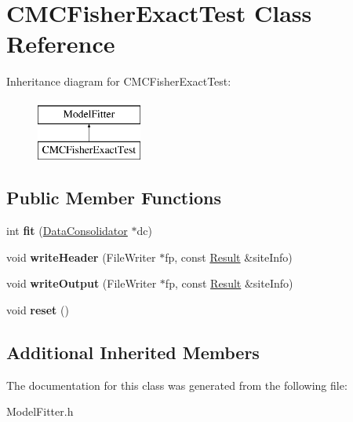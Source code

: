 \hypertarget{classCMCFisherExactTest}{\section{C\-M\-C\-Fisher\-Exact\-Test Class Reference}
\label{classCMCFisherExactTest}
}
Inheritance diagram for C\-M\-C\-Fisher\-Exact\-Test\-:\begin{figure}[H]
\begin{center}
\leavevmode
\includegraphics[height=2.000000cm]{classCMCFisherExactTest}
\end{center}
\end{figure}
\subsection*{Public Member Functions}
\begin{DoxyCompactItemize}
\item 
\hypertarget{classCMCFisherExactTest_aff85bb19c2937f8c17c0db4707919dc0}{int {\bfseries fit} (\hyperlink{classDataConsolidator}{Data\-Consolidator} $\ast$dc)}\label{classCMCFisherExactTest_aff85bb19c2937f8c17c0db4707919dc0}

\item 
\hypertarget{classCMCFisherExactTest_afc44c2bd2677c4e8de567b7b1416f396}{void {\bfseries write\-Header} (File\-Writer $\ast$fp, const \hyperlink{classResult}{Result} \&site\-Info)}\label{classCMCFisherExactTest_afc44c2bd2677c4e8de567b7b1416f396}

\item 
\hypertarget{classCMCFisherExactTest_ad50690135c2eed0f7a7b87ba4877fd17}{void {\bfseries write\-Output} (File\-Writer $\ast$fp, const \hyperlink{classResult}{Result} \&site\-Info)}\label{classCMCFisherExactTest_ad50690135c2eed0f7a7b87ba4877fd17}

\item 
\hypertarget{classCMCFisherExactTest_aea187dfb0eaf1b155d47ef3bb18b73ac}{void {\bfseries reset} ()}\label{classCMCFisherExactTest_aea187dfb0eaf1b155d47ef3bb18b73ac}

\end{DoxyCompactItemize}
\subsection*{Additional Inherited Members}


The documentation for this class was generated from the following file\-:\begin{DoxyCompactItemize}
\item 
Model\-Fitter.\-h\end{DoxyCompactItemize}
